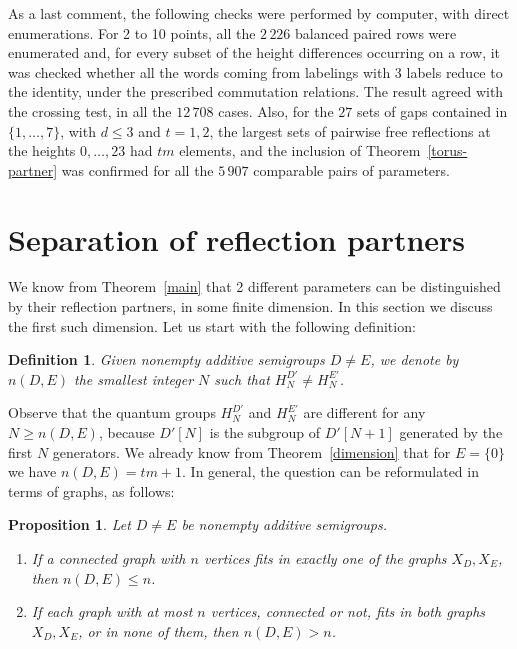\documentclass[11pt,a4paper]{article}
\newtheorem{prop}[thm]{Proposition}
\newtheorem{defn}[thm]{Definition}
\begin{document}
As a last comment, the following checks were performed by computer, with direct enumerations. For 2 to 10 points, all the $2\,226$ balanced paired rows were enumerated and, for every subset of the height differences occurring on a row, it was checked whether all the words coming from labelings with 3 labels reduce to the identity, under the prescribed commutation relations. The result agreed with the crossing test, in all the $12\,708$ cases. Also, for the $27$ sets of gaps contained in $\{1,\ldots,7\}$, with $d\leq3$ and $t=1,2$, the largest sets of pairwise free reflections at the heights $0,\ldots,23$ had $tm$ elements, and the inclusion of Theorem~\ref{torus-partner} was confirmed for all the $5\,907$ comparable pairs of parameters.

\section{Separation of reflection partners}\label{separation}

We know from Theorem~\ref{main} that 2 different parameters can be distinguished by their reflection partners, in some finite dimension. In this section we discuss the first such dimension. Let us start with the following definition:

\begin{defn}\label{first-dimension}
Given nonempty additive semigroups $D\neq E$, we denote by $n(D,E)$ the smallest integer $N$ such that $H_N^{D'}\neq H_N^{E'}$.
\end{defn}

Observe that the quantum groups $H_N^{D'}$ and $H_N^{E'}$ are different for any $N\geq n(D,E)$, because $D'[N]$ is the subgroup of $D'[N+1]$ generated by the first $N$ generators. We already know from Theorem~\ref{dimension} that for $E=\{0\}$ we have $n(D,E)=tm+1$. In general, the question can be reformulated in terms of graphs, as follows:

\begin{prop}\label{criteria}
Let $D\neq E$ be nonempty additive semigroups.
\begin{enumerate}
\item If a connected graph with $n$ vertices fits in exactly one of the graphs $X_D,X_E$, then $n(D,E)\leq n$.

\item If each graph with at most $n$ vertices, connected or not, fits in both graphs $X_D,X_E$, or in none of them, then $n(D,E)>n$.
\end{enumerate}
\end{prop}
\end{document}
